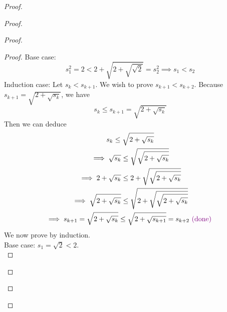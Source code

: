 \documentclass{report}
\begin{document}
\begin{proof}
\begin{proof}
\begin{proof}
\begin{proof}
Base case:
\begin{equation}
s_1^2=2<2+\sqrt{2+\sqrt{\sqrt{2} } }=s_2^2 \implies s_1<s_2
\end{equation}
Induction case: Let $s_k<s_{k+1}$. We wish to prove $s_{k+1}<s_{k+2}$. Because $s_{k+1}=\sqrt{2+\sqrt{s_k} } $, we have
\begin{equation}
s_k\leq s_{k+1}=\sqrt{2+\sqrt{s_k} } 
\end{equation}
Then we can deduce
\begin{gather}
s_k\leq \sqrt{2+\sqrt{s_k} } \\
\implies \sqrt{s_k}\leq \sqrt{\sqrt{2+\sqrt{s_k} } }\\
\implies 2+\sqrt{s_k}\leq 2+\sqrt{\sqrt{2+\sqrt{s_k} } }\\
\implies \sqrt{2+\sqrt{s_k} }\leq \sqrt{2+\sqrt{\sqrt{2+\sqrt{s_k} } } }\\
\implies s_{k+1}=\sqrt{2+\sqrt{s_k} }\leq \sqrt{2+\sqrt{s_{k+1}} }=s_{k+2}\textcolor{violet}{\text{ (done) }}
\end{gather}
We now prove  by induction.\\

Base case: $s_1=\sqrt{2}<2$.\\


\end{proof}
\end{proof}
\end{proof}
\end{proof}
\end{document}
